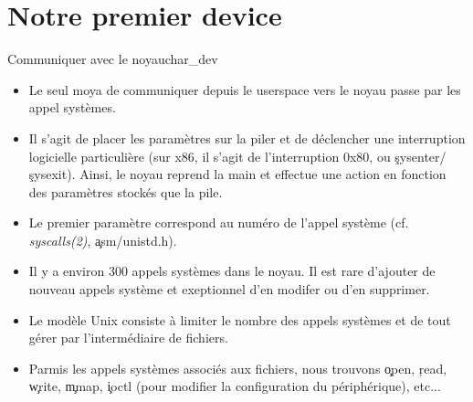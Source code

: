 \section{Notre premier device}


\begin{frame}[fragile=singleslide]{Communiquer avec le noyau}{char\_dev}
  \begin{itemize} 
  \item Le seul moya de  communiquer depuis le userspace vers le noyau
    passe par les appel systèmes.
  \item  Il  s'agit  de placer  les  paramètres  sur  la piler  et  de
    déclencher une  interruption logicielle particulière  (sur x86, il
    s'agit         de          l'interruption         0x80,         ou
    \c{sysenter}/\c{sysexit}).  Ainsi,  le noyau  reprend  la main  et
    effectue  une action  en fonction  des paramètres  stockés  que la
    pile.
  \item Le  premier paramètre correspond au numéro  de l'appel système
    (cf.  \emph{syscalls(2)}, \c{asm/unistd.h}).
  \item Il y a environ 300  appels systèmes dans le noyau. Il est rare
    d'ajouter de nouveau appels système et exeptionnel d'en modifer ou
    d'en supprimer.
  \item  Le  modèle Unix  consiste  à  limiter  le nombre  des  appels
    systèmes et de tout gérer par l'intermédiaire de fichiers.
  \item  Parmis  les  appels  systèmes  associés  aux  fichiers,  nous
    trouvons \c{open}, \c{read},  \c{write}, \c{mmap}, \c{ioctl} (pour
    modifier la configuration du périphérique), etc...
  \end{itemize}
\end{frame}

